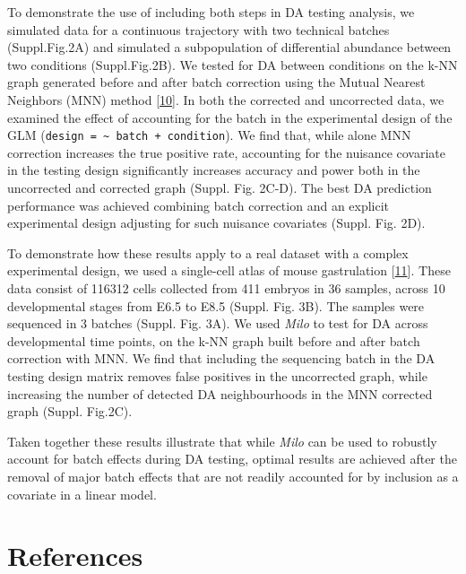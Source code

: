 \documentclass[
]{article}
\begin{document}
To demonstrate the use of including both steps in DA testing analysis, we simulated data for a continuous trajectory with two technical batches (Suppl.Fig.2A) and simulated a subpopulation of differential abundance between two conditions (Suppl.Fig.2B). We tested for DA between conditions on the k-NN graph generated before and after batch correction using the Mutual Nearest Neighbors (MNN) method {[}\protect\hyperlink{ref-haghverdiBatchEffectsSinglecell2018}{10}{]}. In both the corrected and uncorrected data, we examined the effect of accounting for the batch in the experimental design of the GLM (\texttt{design\ =\ \textasciitilde{}\ batch\ +\ condition}). We find that, while alone MNN correction increases the true positive rate, accounting for the nuisance covariate in the testing design significantly increases accuracy and power both in the uncorrected and corrected graph (Suppl. Fig. 2C-D). The best DA prediction performance was achieved combining batch correction and an explicit experimental design adjusting for such nuisance covariates (Suppl. Fig. 2D).

To demonstrate how these results apply to a real dataset with a complex experimental design, we used a single-cell atlas of mouse gastrulation {[}\protect\hyperlink{ref-pijuan-salaSinglecellMolecularMap2019}{11}{]}. These data consist of 116312 cells collected from 411 embryos in 36 samples, across 10 developmental stages from E6.5 to E8.5 (Suppl. Fig. 3B). The samples were sequenced in 3 batches (Suppl. Fig. 3A). We used \emph{Milo} to test for DA across developmental time points, on the k-NN graph built before and after batch correction with MNN. We find that including the sequencing batch in the DA testing design matrix removes false positives in the uncorrected graph, while increasing the number of detected DA neighbourhoods in the MNN corrected graph (Suppl. Fig.2C).

Taken together these results illustrate that while \emph{Milo} can be used to robustly account for batch effects during DA testing, optimal results are achieved after the removal of major batch effects that are not readily accounted for by inclusion as a covariate in a linear model.

\hypertarget{references}{%
\section*{References}\label{references}}
\end{document}
